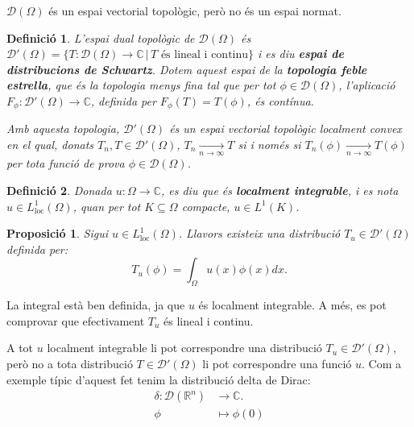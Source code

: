 \documentclass{article}
\numberwithin{equation}{section}
\newtheorem{definicio}{Definici\'{o}}[section]
\newtheorem{proposicio}{Proposici\'{o}}[section]
\begin{document}
$\mathcal{D}(\Omega)$ \'{e}s un espai vectorial topol\`{o}gic, per\`{o} no \'{e}s un espai normat.

\begin{definicio}\label{Def: distribucio Schwartz}
L'espai dual topol\`{o}gic de $\mathcal{D}(\Omega)$ \'{e}s $\mathcal{D}'(\Omega)=\{T:\mathcal{D}(\Omega)\rightarrow\mathbb{C}\,|\,T\text{ \'{e}s lineal i continu}\}$ i es diu \textbf{espai de distribucions de Schwartz}. Dotem aquest espai de la \textbf{topologia feble estrella}, que \'{e}s la topologia menys fina tal que per tot $\phi\in\mathcal{D}(\Omega)$, l'aplicaci\'{o} $F_{\phi}:\mathcal{D}'(\Omega)\rightarrow\mathbb{C}$, definida per $F_{\phi}(T)=T(\phi)$, \'{e}s cont\'{i}nua.

Amb aquesta topologia, $\mathcal{D}'(\Omega)$ \'{e}s un espai vectorial topol\`{o}gic localment convex en el qual, donats $T_n,T\in\mathcal{D}'(\Omega)$, $T_n\xrightarrow[n\to\infty]{}T$ si i nom\'{e}s si $T_n(\phi)\xrightarrow[n\to\infty]{}T(\phi)$ per tota funci\'{o} de prova $\phi\in\mathcal{D}(\Omega)$.
\end{definicio}

\begin{definicio}
Donada $u:\Omega\rightarrow\mathbb{C}$, es diu que \'{e}s \textbf{localment integrable}, i es nota $u\in L_{\text{loc}}^1(\Omega)$, quan per tot $K\subseteq\Omega$ compacte, $u\in L^1(K)$.
\end{definicio}

\begin{proposicio}\label{Pro: distribucio funcio}
Sigui $u\in L_{\text{loc}}^1(\Omega)$. Llavors existeix una distribuci\'{o} $T_u\in\mathcal{D}'(\Omega)$ definida per:
\[T_u(\phi)=\int_{\Omega}u(x)\phi(x)dx.\]
\end{proposicio}

La integral est\`{a} ben definida, ja que $u$ \'{e}s localment integrable. A m\'{e}s, es pot comprovar que efectivament $T_u$ \'{e}s lineal i continu.

A tot $u$ localment integrable li pot correspondre una distribuci\'{o} $T_u\in\mathcal{D}'(\Omega)$, per\`{o} no a tota distribuci\'{o} $T\in\mathcal{D}'(\Omega)$ li pot correspondre una funci\'{o} $u$. Com a exemple t\'{i}pic d'aquest fet tenim la distribuci\'{o} delta de Dirac:
\[
\begin{split}
\delta:\mathcal{D}(\mathbb{R}^n)&\longrightarrow\mathbb{C}.\\
\phi&\longmapsto\phi(0)
\end{split}
\]
\end{document}
